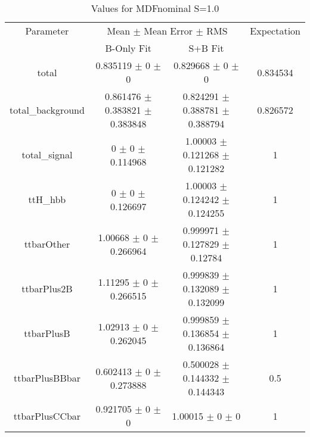 \begin{table}
\centering
\caption{Values for MDFnominal S=1.0}
\begin{tabular}{cccc}
\toprule
Parameter & \multicolumn{2}{c}{Mean $\pm$ Mean Error $\pm$ RMS} & Expectation\\
 & B-Only Fit & S+B Fit & \\
\midrule
total & \num{0.835119} $\pm$ \num{0} $\pm$ \num{0} & \num{0.829668} $\pm$ \num{0} $\pm$ \num{0} & \num{0.834534}\\
total\_background & \num{0.861476} $\pm$ \num{0.383821} $\pm$ \num{0.383848} & \num{0.824291} $\pm$ \num{0.388781} $\pm$ \num{0.388794} & \num{0.826572}\\
total\_signal & \num{0} $\pm$ \num{0} $\pm$ \num{0.114968} & \num{1.00003} $\pm$ \num{0.121268} $\pm$ \num{0.121282} & \num{1}\\
ttH\_hbb & \num{0} $\pm$ \num{0} $\pm$ \num{0.126697} & \num{1.00003} $\pm$ \num{0.124242} $\pm$ \num{0.124255} & \num{1}\\
ttbarOther & \num{1.00668} $\pm$ \num{0} $\pm$ \num{0.266964} & \num{0.999971} $\pm$ \num{0.127829} $\pm$ \num{0.12784} & \num{1}\\
ttbarPlus2B & \num{1.11295} $\pm$ \num{0} $\pm$ \num{0.266515} & \num{0.999839} $\pm$ \num{0.132089} $\pm$ \num{0.132099} & \num{1}\\
ttbarPlusB & \num{1.02913} $\pm$ \num{0} $\pm$ \num{0.262045} & \num{0.999859} $\pm$ \num{0.136854} $\pm$ \num{0.136864} & \num{1}\\
ttbarPlusBBbar & \num{0.602413} $\pm$ \num{0} $\pm$ \num{0.273888} & \num{0.500028} $\pm$ \num{0.144332} $\pm$ \num{0.144343} & \num{0.5}\\
ttbarPlusCCbar & \num{0.921705} $\pm$ \num{0} $\pm$ \num{0} & \num{1.00015} $\pm$ \num{0} $\pm$ \num{0} & \num{1}\\
\bottomrule
\end{tabular}
\end{table}